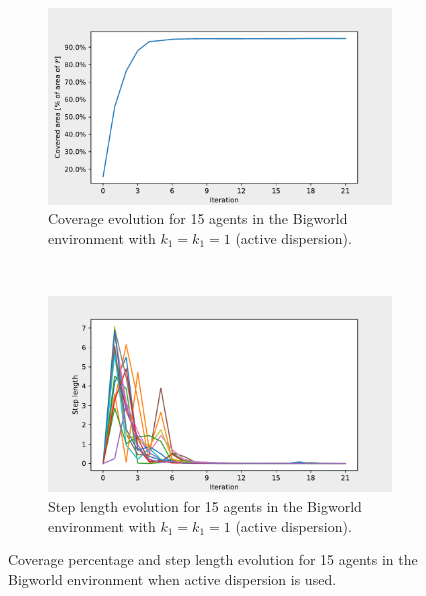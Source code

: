 \begin{figure}[H]
  \centering
  \begin{subfigure}[t]{0.5\textwidth}
    \centering
    \includegraphics[width=\textwidth]{figs/bigworld_15_agnt_k_1_1_k_2_1_area_traj.pdf}
    \caption{Coverage evolution for 15 agents in the Bigworld environment with $k_{1} = k_{1} = 1$ (active dispersion).}
    \label{fig:15_agnt_bw_k_1_1_a_traj}
  \end{subfigure}%
  ~ 
  \begin{subfigure}[t]{0.5\textwidth}
    \centering
    \includegraphics[width=\textwidth]{figs/bigworld_15_agnt_k_1_1_k_2_1_step_traj.pdf}
    \caption{Step length evolution for 15 agents in the Bigworld environment with $k_{1} = k_{1} = 1$ (active dispersion).}
    \label{fig:15_agnt_bw_k_1_1_s_traj}
  \end{subfigure}
  \caption{Coverage percentage and step length evolution for 15 agents in the Bigworld environment when active dispersion is used.}
  \label{fig:15_agnt_bw_evolution_active}
\end{figure}